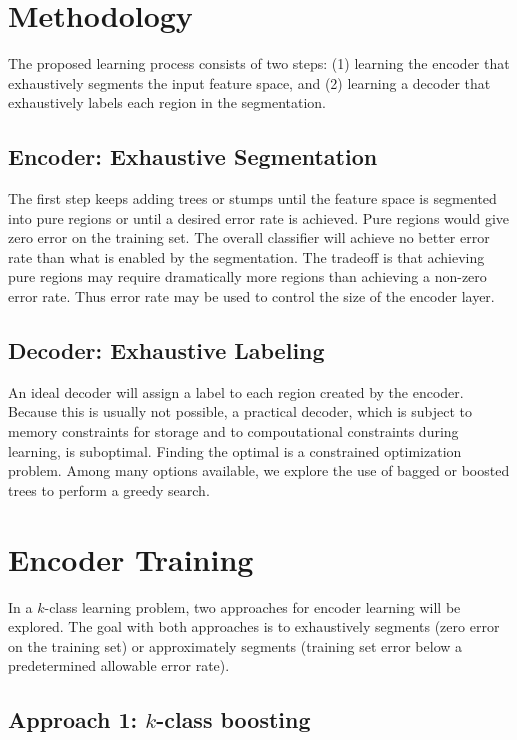 \documentclass{article}
\begin{document}
\section{Methodology}

The proposed learning process consists of two steps: (1) learning the encoder that exhaustively segments the input feature space, and (2) learning a decoder that exhaustively labels each region in the segmentation.

\subsection{Encoder: Exhaustive Segmentation}

The first step keeps adding trees or stumps until the feature space is segmented into pure regions or until a desired error rate is achieved.  Pure regions would give zero error on the training set.  The overall classifier will achieve no better error rate than what is enabled by the segmentation.  The tradeoff is that achieving pure regions may require dramatically more regions than achieving a non-zero error rate.  Thus error rate may be used to control the size of the encoder layer.

\subsection{Decoder: Exhaustive Labeling}

An ideal decoder will assign a label to each region created by the encoder.  Because this is usually not possible, a practical decoder, which is subject to memory constraints for storage and to compoutational constraints during learning, is suboptimal.  Finding the optimal is a constrained optimization problem.  Among many options available, we explore the use of bagged or boosted trees to perform a greedy search.

\section{Encoder Training}

In a $k$-class learning problem, two approaches for encoder learning will be explored.  The goal with both approaches is to exhaustively segments (zero error on the training set) or approximately segments (training set error below a predetermined allowable error rate).

\subsection{Approach 1: $k$-class boosting}
\end{document}
